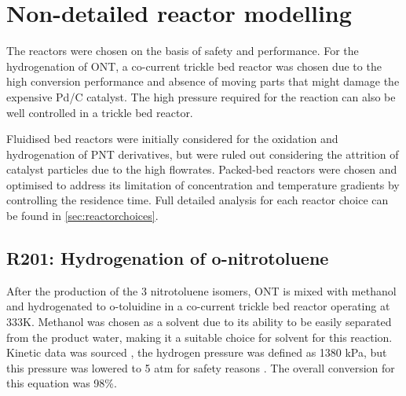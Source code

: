 \section{Non-detailed reactor modelling} \label{Non-detailed}

The reactors were chosen on the basis of safety and performance. For the hydrogenation of ONT, a co-current trickle bed reactor was chosen due to the high conversion performance and absence of moving parts that might damage the expensive Pd/C catalyst. The high pressure required for the reaction can also be well controlled in a trickle bed reactor. 

Fluidised bed reactors were initially considered for the oxidation and hydrogenation of PNT derivatives, but were ruled out considering the attrition of catalyst particles due to the high flowrates. Packed-bed reactors were chosen and optimised to address its limitation of concentration and temperature gradients by controlling the residence time. Full detailed analysis for each reactor choice can be found in \cref{sec:reactorchoices}.

\begin{table}[h]
\centering
\caption{Summary of non-detailed reactors}
\label{tab:nondetailedtable}
\end{table}

\subsection{R201: Hydrogenation of o-nitrotoluene}
After the production of the 3 nitrotoluene isomers, ONT is mixed with methanol and hydrogenated to o-toluidine in a co-current trickle bed reactor operating at 333K. Methanol was chosen as a solvent due to its ability to be easily separated from the product water, making it a suitable choice for solvent for this reaction. Kinetic data was sourced \cite{rajadhyaksha_solvent_1986}, the hydrogen pressure was defined as 1380 kPa, but this pressure was lowered to 5 atm for safety reasons \cite{rajadhyaksha_solvent_1986}. The overall conversion for this equation was 98\%.

